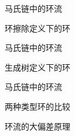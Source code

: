 \documentclass{beamer}
\begin{document}
	\begin{frame}{马氏链中的环流}
		\begin{block}{环擦除定义下的环}
			
			\begin{table}[htb!]
				\renewcommand \arraystretch{1} \centering
				\caption{导出链的变化过程和轨道中形成的环}\label{trajectory}
			\end{table}
		\end{block}

	\end{frame}

	\begin{frame}{马氏链中的环流}
		\begin{block}{生成树定义下的环}

			
		\end{block}
		
	\end{frame}

	\begin{frame}{马氏链中的环流}
		\begin{block}{两种类型环的比较}

			
		\end{block}
		
	\end{frame}

	\begin{frame}{环流的大偏差原理}
		
	\end{frame}
\end{document}

